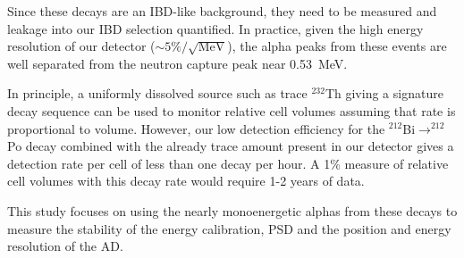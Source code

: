 Since these decays are an IBD-like background, they need to be measured and leakage into our IBD selection quantified. In practice, given the high energy resolution of our detector ($\sim5\%/\sqrt{\textrm{MeV}}$), the alpha peaks from these events are well separated from the neutron capture peak near 0.53~MeV.

In principle, a uniformly dissolved source such as trace $^{232}$Th giving a signature decay sequence can be used to monitor relative cell volumes assuming that rate is proportional to volume. However, our low detection efficiency for the $^{212}$Bi$\rightarrow^{212}$Po decay combined with the already trace amount present in our detector gives a detection rate per cell of less than one decay per hour. A 1\% measure of relative cell volumes with this decay rate would require 1-2 years of data.

This study focuses on using the nearly monoenergetic alphas from these decays to measure the stability of the energy calibration, PSD and the position and energy resolution of the AD. 

